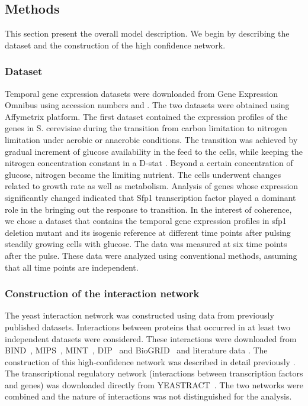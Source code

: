 \documentclass{bioinfo}
\begin{document}
\begin{methods}
\section{Methods}
\label{sec:methods}


This section present the overall model description. We begin by
describing the dataset and the construction of the high confidence
network.
\subsubsection{Dataset}
 Temporal gene expression datasets were downloaded from Gene
 Expression Omnibus using accession numbers  and . The two
 datasets were obtained using Affymetrix platform. The first dataset
 contained the expression profiles of the genes in S. cerevisiae
 during the transition from carbon limitation to nitrogen limitation
 under aerobic or anaerobic conditions. The transition was achieved by
 gradual increment of glucose availability in the feed to the cells,
 while keeping the nitrogen concentration constant in a D-stat
 . Beyond a certain concentration of glucose,
 nitrogen became the limiting nutrient. The cells underwent changes
 related to growth rate as well as metabolism. Analysis of genes whose
 expression significantly changed indicated that Sfp1 transcription
 factor played a dominant role in the bringing out the response to
 transition. In the interest of coherence, we chose a dataset that
 contains the temporal gene expression profiles in sfp1 deletion
 mutant and its isogenic reference at different time points after
 pulsing steadily growing cells with glucose. The data was measured at
 six time points after the pulse. These data were analyzed using
 conventional methods, assuming that all time points are independent.

\subsubsection{Construction of the interaction network}
\label{sec:known-network}
The yeast interaction network was constructed using data from
previously published datasets. Interactions between proteins that
occurred in at least two independent datasets were considered. These
interactions were downloaded from
BIND~\citep{Bader:2003:Nucleic-Acids-Res:12519993}, MIPS~\citep{MIPS},
MINT~\citep{citeulike:3733950}, DIP~\citep{citeulike:226627}  and
BioGRID~\citep{citeulike:814974}  and literature data . The construction of this high-confidence network was
described in detail previously . The
transcriptional regulatory network (interactions between transcription
factors and genes) was downloaded directly from
YEASTRACT~\citep{citeulike:473096}. The two networks were combined and
the nature of  interactions was not distinguished for the analysis.


\end{methods}
\end{document}
